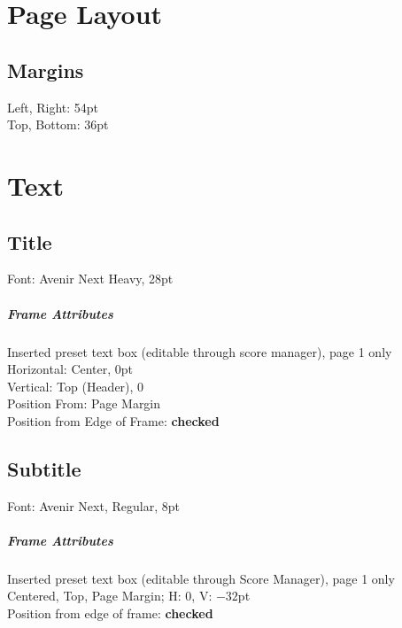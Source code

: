 \documentclass[unicode,hyperfootnotes=false,xetex,colorlinks=true,nofonts,nobib]{tufte-book} %
\begin{document}
\chapter{Page Layout}
\section{Margins}
Left, Right: 54pt\\
Top, Bottom: 36pt
\chapter{Text}
\section{Title}
Font: Avenir Next Heavy, 28pt

\paragraph{Frame Attributes}
Inserted preset text box (editable through score manager), page 1 only\\
Horizontal: Center, 0pt\\
Vertical: Top (Header), 0\\
Position From: Page Margin\\
Position from Edge of Frame: \textbf{checked}

\section{Subtitle}
\label{sec:subtitle}

Font: Avenir Next, Regular, 8pt

\paragraph{Frame Attributes}
\label{sec:frame-attributes}

Inserted preset text box (editable through Score Manager), page 1 only\\
Centered, Top, Page Margin; H: 0, V: $-32$pt\\
Position from edge of frame: \textbf{checked}
\end{document}
